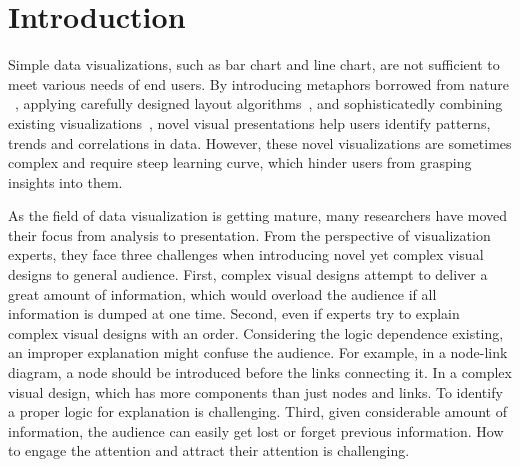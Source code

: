 
\section{Introduction} %
Simple data visualizations, such as bar chart and line chart, are not sufficient to meet various needs of end users.
By introducing metaphors borrowed from nature ~\cite{cao_whisper:_2012,huron_visual_2013}, applying carefully designed layout algorithms~\cite{wu_opinionflow:_2014,chi_morphable_2015}, and sophisticatedly combining existing visualizations~\cite{zhao_x0023;fluxflow:_2014}, novel visual presentations help users identify patterns, trends and correlations in data. However, these novel visualizations are sometimes complex and require steep learning curve, which hinder users from grasping insights into them.

As the field of data visualization is getting mature, many researchers have moved their focus from analysis to presentation.
From the perspective of visualization experts, they face three challenges when introducing novel yet complex visual designs to general audience.
First, complex visual designs attempt to deliver a great amount of information, which would overload the audience if all information is dumped at one time. Second, even if experts try to explain complex visual designs with an order. Considering the logic dependence existing, an improper explanation might confuse the audience. For example, in a node-link diagram, a node should be introduced before the links connecting it. In a complex visual design, which has more components than just nodes and links. To identify a proper logic for explanation is challenging. Third, given considerable amount of information, the audience can easily get lost or forget previous information. How to engage the attention and attract their attention is challenging.  

